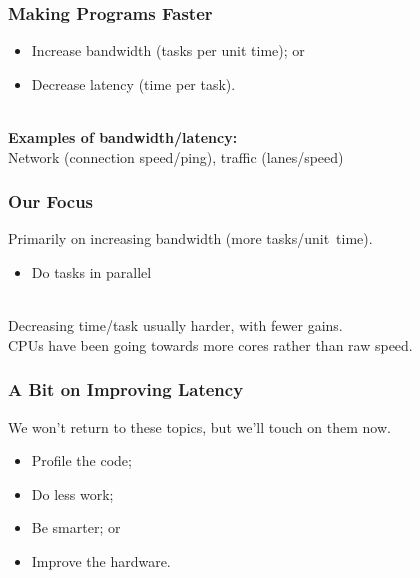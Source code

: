 \documentclass[aspectratio=43]{beamer}
\newenvironment{changemargin}[1]{%
  \begin{list}{}{%
    \setlength{\topsep}{0pt}%
    \setlength{\leftmargin}{#1}%
    \setlength{\rightmargin}{1em}
    \setlength{\listparindent}{\parindent}%
    \setlength{\itemindent}{\parindent}%
    \setlength{\parsep}{\parskip}%
  }%
  \item[]}{\end{list}}
\begin{document}
\begin{frame}
  \frametitle{Making Programs Faster}
  \begin{changemargin}{2cm}
  \begin{itemize}
    \item Increase bandwidth (tasks per unit time); or
    \item Decrease latency (time per task).
  \end{itemize}~\\[1em]
 {\bf Examples of bandwidth/latency:}\\Network (connection speed/ping),
          traffic (lanes/speed)
  \end{changemargin}

\end{frame}

\begin{frame}
  \frametitle{Our Focus}

\hspace*{.15\textwidth}\begin{minipage}{.8\textwidth}
  Primarily on increasing bandwidth (more tasks/unit~time).
  \begin{itemize}
    \item Do tasks in parallel
  \end{itemize}
~\\[1em]
   Decreasing time/task usually harder, with
          fewer gains.\\[1em]
   CPUs have been going towards more cores rather than raw
          speed.\\[1em]
\end{minipage}

\end{frame}

\begin{frame}
  \frametitle{A Bit on Improving Latency}

\hspace*{.15\textwidth}\begin{minipage}{.85\textwidth}
  We won't return to these topics, but we'll touch on them now.\\

  \begin{itemize}
    \item Profile the code;
    \vfill
    \item Do less work;
    \vfill
    \item Be smarter; or
    \vfill
    \item Improve the hardware.
  \end{itemize}
\end{minipage}

\end{frame}
\end{document}
